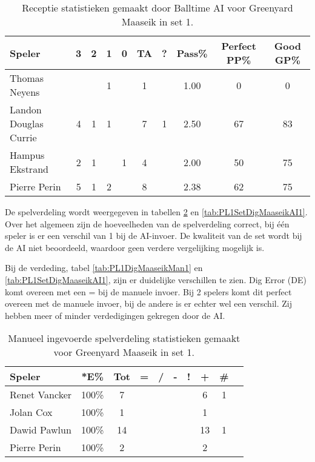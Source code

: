 \begin{table}[ht!]
  \centering
  \scriptsize
  \begin{tabular}{|l|c|c|c|c|c|c|c|c|c|} \hline
    \textbf{Speler} & 3 & 2 & 1 & 0 & TA & ? & Pass\% & Perfect PP\% & Good GP\% \\ \hline
    Thomas Neyens &  &  & 1 &  & 1 &  & 1.00 & 0 & 0  \\
    Landon Douglas Currie & 4 & 1 & 1 &  & 7 & 1 & 2.50 & 67 & 83 \\
    Hampus Ekstrand & 2 & 1 &  & 1 & 4 &  & 2.00 & 50 & 75 \\
    Pierre Perin & 5 & 1 & 2 &  & 8 &  & 2.38 & 62 & 75 \\ \hline
  \end{tabular}
  \caption[Receptie statistieken gemaakt door Balltime AI voor Greenyard Maaseik in set 1]{\label{tab:PL1ReceiveMaaseikAI1}Receptie statistieken gemaakt door Balltime AI voor Greenyard Maaseik in set 1.}
\end{table}

De spelverdeling wordt weergegeven in tabellen \ref{tab:PL1SetMaaseikMan1} en \ref{tab:PL1SetDigMaaseikAI1}. Over het algemeen zijn de hoeveelheden van de spelverdeling correct, bij één speler is er een verschil van 1 bij de AI-invoer. De kwaliteit van de set wordt bij de AI niet beoordeeld, waardoor geen verdere vergelijking mogelijk is.

Bij de verdeding, tabel \ref{tab:PL1DigMaaseikMan1} en \ref{tab:PL1SetDigMaaseikAI1}, zijn er duidelijke verschillen te zien. Dig Error (DE) komt overeen met een = bij de manuele invoer. Bij 2 spelers komt dit perfect overeen met de manuele invoer, bij de andere is er echter wel een verschil.  Zij hebben meer of minder verdedigingen gekregen door de AI.

\begin{table}[ht!]
    \centering
    \scriptsize
    \begin{tabular}{|l|c|c|c|c|c|c|c|c|c|}
        \hline
        \textbf{Speler}& *E\% & Tot & = & / & - & ! & + & \# \\ \hline
        Renet Vancker  & 100\% & 7 &  &  &  &  & 6 & 1  \\
        Jolan Cox  & 100\% & 1 &  &  &  &  & 1 &  \\ 
        Dawid Pawlun  & 100\% & 14 &  &  &  &  & 13 & 1  \\ 
        Pierre Perin & 100\% & 2 &  &  &  &  & 2 & \\ \hline
    \end{tabular}
    \caption[Manueel ingevoerde spelverdelingsstatistieken gemaakt voor Greenyard Maaseik in set 1]{\label{tab:PL1SetMaaseikMan1}Manueel ingevoerde spelverdeling statistieken gemaakt voor Greenyard Maaseik in set 1.}
\end{table}

